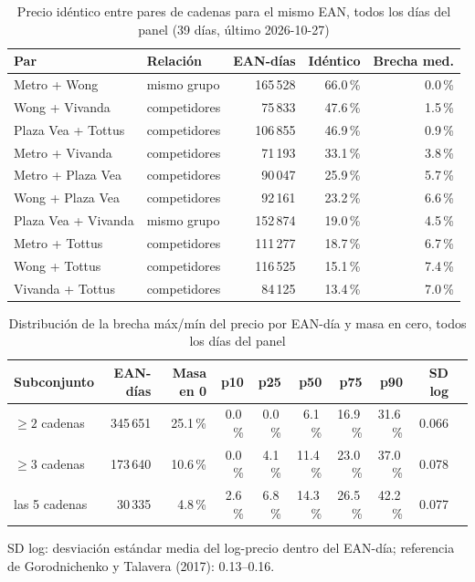 
\begin{table}[htbp]
\caption{Precio id\'entico entre pares de cadenas para el mismo EAN, todos los d\'ias del panel (39 d\'ias, \'ultimo 2026-10-27)}
\label{tab:identidad}
\centering\scriptsize\setlength{\tabcolsep}{3pt}
\begin{tabular}{@{}llrrr@{}}
\toprule
Par & Relaci\'on & EAN-d\'ias & Id\'entico & Brecha med. \\
\midrule
Metro + Wong & mismo grupo & 165\,528 & 66.0\,\% & 0.0\,\% \\
Wong + Vivanda & competidores & 75\,833 & 47.6\,\% & 1.5\,\% \\
Plaza Vea + Tottus & competidores & 106\,855 & 46.9\,\% & 0.9\,\% \\
Metro + Vivanda & competidores & 71\,193 & 33.1\,\% & 3.8\,\% \\
Metro + Plaza Vea & competidores & 90\,047 & 25.9\,\% & 5.7\,\% \\
Wong + Plaza Vea & competidores & 92\,161 & 23.2\,\% & 6.6\,\% \\
Plaza Vea + Vivanda & mismo grupo & 152\,874 & 19.0\,\% & 4.5\,\% \\
Metro + Tottus & competidores & 111\,277 & 18.7\,\% & 6.7\,\% \\
Wong + Tottus & competidores & 116\,525 & 15.1\,\% & 7.4\,\% \\
Vivanda + Tottus & competidores & 84\,125 & 13.4\,\% & 7.0\,\% \\
\bottomrule\end{tabular}\end{table}

\begin{table}[t]
\caption{Distribuci\'on de la brecha m\'ax/m\'in del precio por EAN-d\'ia y masa en cero, todos los d\'ias del panel}
\label{tab:brecha}
\centering\scriptsize\setlength{\tabcolsep}{4pt}
\begin{tabular}{@{}lrrrrrrrrr@{}}
\toprule
Subconjunto & EAN-d\'ias & Masa en 0 & p10 & p25 & p50 & p75 & p90 & SD log \\
\midrule
$\geq 2$ cadenas & 345\,651 & 25.1\,\% & 0.0\,\% & 0.0\,\% & 6.1\,\% & 16.9\,\% & 31.6\,\% & 0.066 \\
$\geq 3$ cadenas & 173\,640 & 10.6\,\% & 0.0\,\% & 4.1\,\% & 11.4\,\% & 23.0\,\% & 37.0\,\% & 0.078 \\
las 5 cadenas & 30\,335 & 4.8\,\% & 2.6\,\% & 6.8\,\% & 14.3\,\% & 26.5\,\% & 42.2\,\% & 0.077 \\
\bottomrule\end{tabular}
\par\smallskip\raggedright\scriptsize SD log: desviaci\'on est\'andar media del log-precio dentro del EAN-d\'ia; referencia de Gorodnichenko y Talavera (2017): 0.13--0.16.
\end{table}

